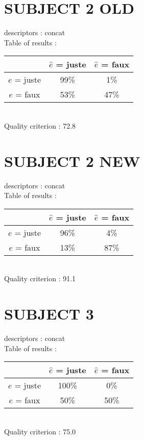 \section*{SUBJECT 2 OLD}
descriptors : concat \\
Table of results : \\
\begin{tabular}{|c|c|c|}
\hline				& $\hat{e}$ = juste & $\hat{e}$ = faux \\
\hline  $e$ = juste	&     99\%			&      1\%		\\
\hline  $e$ = faux	&     53\%			&     47\%		\\
\hline
\end{tabular}\\
Quality criterion :   72.8 \\

\newpage
\section*{SUBJECT 2 NEW}
descriptors : concat \\
Table of results : \\
\begin{tabular}{|c|c|c|}
\hline				& $\hat{e}$ = juste & $\hat{e}$ = faux \\
\hline  $e$ = juste	&     96\%			&      4\%		\\
\hline  $e$ = faux	&     13\%			&     87\%		\\
\hline
\end{tabular}\\
Quality criterion :   91.1 \\

\section*{SUBJECT 3}
descriptors : concat \\
Table of results : \\
\begin{tabular}{|c|c|c|}
\hline				& $\hat{e}$ = juste & $\hat{e}$ = faux \\
\hline  $e$ = juste	&    100\%			&      0\%		\\
\hline  $e$ = faux	&     50\%			&     50\%		\\
\hline
\end{tabular}\\
Quality criterion :   75.0 \\

\newpage
